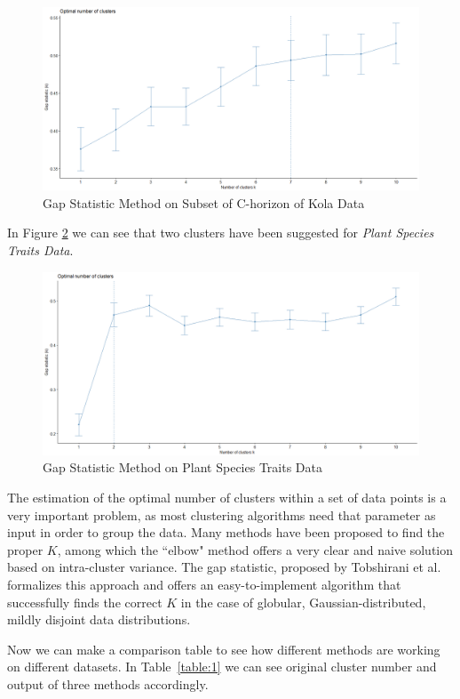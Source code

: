 \begin{itemize}
\begin{figure}[h!]
  \centering
  \includegraphics[scale=1.3]{figures/results/chorsub/gap.png}
  \caption{Gap Statistic Method on Subset of C-horizon of Kola Data}
  \label{fig:gap9}
\end{figure}

\newpage

In Figure \ref{fig:gap10} we can see that two clusters have been suggested for \textit{Plant Species Traits Data}.

\begin{figure}[h!]
  \centering
  \includegraphics[scale=1.3]{figures/results/plantTraits/gap.png}
  \caption{Gap Statistic Method on Plant Species Traits Data}
  \label{fig:gap10}
\end{figure}

\vspace{10mm}

The estimation of the optimal number of clusters within a set of data points is a very important problem, as most clustering algorithms need that parameter as input in order to group the data. Many methods have been proposed to find the proper $K$, among which the ``elbow" method offers a very clear and naive solution based on intra-cluster variance. The gap statistic, proposed by Tobshirani et al. formalizes this approach and offers an easy-to-implement algorithm that successfully finds the correct $K$ in the case of globular, Gaussian-distributed, mildly disjoint data distributions.

\end{itemize}
Now we can make a comparison table to see how different methods are working on different datasets. In Table~\ref{table:1} we can see original cluster number and output of three methods accordingly.

